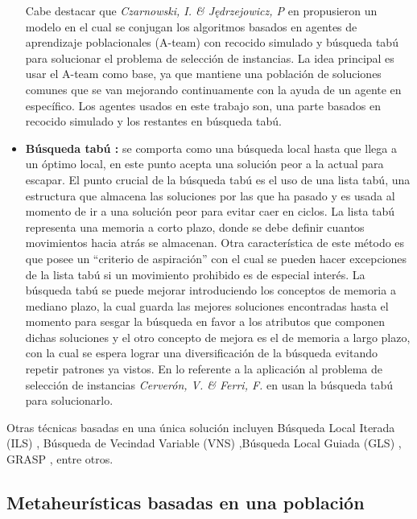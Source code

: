 \begin{itemize}
Cabe destacar que \emph{Czarnowski, I. \& J{\k{e}}drzejowicz, P} en \cite{czarnowski2011application} propusieron un modelo en el cual se conjugan los algoritmos basados en agentes de aprendizaje poblacionales (A-team) \cite{talukdar1998asynchronous} con recocido simulado y búsqueda tabú para solucionar el problema de selección de instancias. La idea principal es usar el A-team como base, ya que mantiene una población de soluciones comunes que se van mejorando continuamente con la ayuda de un agente en específico. Los agentes usados en este trabajo son, una parte basados en recocido simulado y los restantes en búsqueda tabú.

\item \textbf{Búsqueda tabú \cite{talbi2009metaheuristics,glover1989tabu}:}
se comporta como una búsqueda local hasta que llega a un óptimo local, en este punto acepta una solución peor a la actual para escapar. El punto crucial de la búsqueda tabú es el uso de una lista tabú, una estructura que almacena las soluciones por las que ha pasado y es usada al momento de ir a una solución peor para evitar caer en ciclos. La lista tabú representa una memoria a corto plazo, donde se debe definir cuantos movimientos hacia atrás se almacenan. Otra característica de este método es que posee un ``criterio de aspiración'' con el cual se pueden hacer excepciones de la lista tabú si un movimiento prohibido es de especial interés. La búsqueda tabú se puede mejorar introduciendo los conceptos de memoria a mediano plazo, la cual guarda las mejores soluciones encontradas hasta el momento para sesgar la búsqueda en favor a los atributos que componen dichas soluciones y el otro concepto de mejora es el de memoria a largo plazo, con la cual se espera lograr una diversificación de la búsqueda evitando repetir patrones ya vistos. En lo referente a la aplicación al problema de selección de instancias \emph{Cerverón, V. \& Ferri, F.} en \cite{cerveron2001another} usan la búsqueda tabú para solucionarlo.
\end{itemize}

Otras técnicas basadas en una única solución incluyen Búsqueda Local Iterada (ILS) \cite{lourencco2003iterated}, Búsqueda de Vecindad Variable (VNS) \cite{mladenovic1997variable},Búsqueda Local Guiada (GLS) \cite{voudouris1998guided}, GRASP \cite{feo1995greedy}, entre otros.

\subsection{Metaheurísticas basadas en una población}

